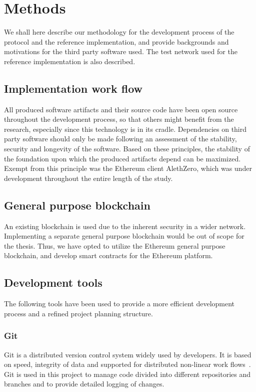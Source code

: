 \chapter{Methods}
We shall here describe our methodology for the development process of the protocol and the reference implementation, and provide backgrounds and motivations for the third party software used. The test network used for the reference implementation is also described.

\section{Implementation work flow}
All produced software artifacts and their source code have been open source throughout the development process, so that others might benefit from the research, especially since this technology is in its cradle. Dependencies on third party software should only be made following an assessment of the stability, security and longevity of the software. Based on these principles, the stability of the foundation upon which the produced artifacts depend can be maximized. Exempt from this principle was the Ethereum client AlethZero, which was under development throughout the entire length of the study. 

\section{General purpose blockchain}
An existing blockchain is used due to the inherent security in a wider network. Implementing a separate general purpose blockchain would be out of scope for the thesis. Thus, we have opted to utilize the Ethereum general purpose blockchain, and develop smart contracts for the Ethereum platform.

\section{Development tools}
The following tools have been used to provide a more efficient development process and a refined project planning structure.

\subsection{Git}
Git is a distributed version control system widely used by developers. It is based on speed, integrity of data and supported for distributed non-linear work flows~\cite{git}. Git is used in this project to manage code divided into different repositories and branches and to provide detailed logging of changes. 

